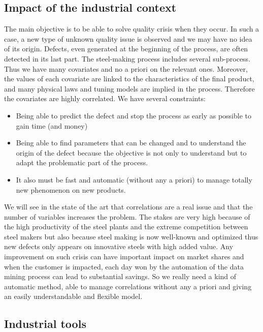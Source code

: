\documentclass[12pt,a4paper]{report}
\begin{document}
	\subsection{Impact of the industrial context}
	 The main objective is to be able to solve quality crisis when they occur. In such a case, a new type of unknown quality issue is observed and we may have no idea of its origin. Defects, even generated at the beginning of the process, are often detected in its last part. The steel-making process includes several sub-process. Thus we have many covariates and no a priori on the relevant ones. Moreover, the values of each covariate are linked to the characteristics of the final product, and many physical laws and tuning models are implied in the process. Therefore the covariates are highly correlated.
	We have several constraints:
	\begin{itemize}
		\item Being able to predict the defect and stop the process as early as possible to gain time (and money)
		\item Being able to find parameters that can be changed and to understand the origin of the defect because the objective is not only to understand but to adapt the problematic part of the process.
		\item It also must be fast and automatic (without any a priori) to manage totally new phenomenon on new products.
	\end{itemize}
	We will see in the state of the art that correlations are a real issue and that the number of variables increases the problem.	
	The stakes are very high because of the high productivity of the steel plants and the extreme competition between steel makers but also because steel making is now well-known and optimized thus new defects only appears on innovative steels with high added value. Any improvement on such crisis can have important impact on market shares and when the customer is impacted, each day won by the automation of the data mining process can lead to substantial savings. So we really need a kind of automatic method, able to manage correlations without any a priori and giving an easily understandable and flexible model.
		\subsection{Industrial tools}
			
\end{document}
